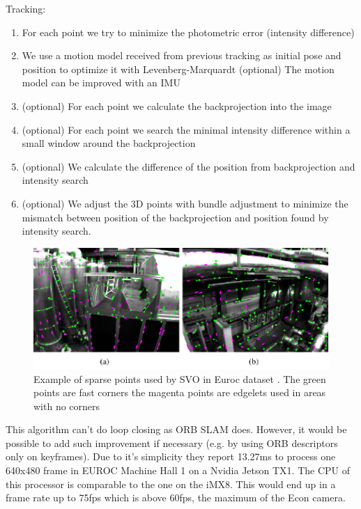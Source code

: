 \documentclass[11pt,a4paper,titlepage,oneside]{report}
\begin{document}
Tracking:
\begin{enumerate}
	\item For each point we try to minimize the photometric error (intensity difference)
	\item We use a motion model received from previous tracking as initial pose and position to optimize it with Levenberg-Marquardt
		\subitem (optional) The motion model can be improved with an IMU
	\item (optional) For each point we calculate the backprojection into the image
	\item (optional) For each point we search the minimal intensity difference within a small window around the backprojection
	\item (optional) We calculate the difference of the position from backprojection and intensity search
	\item (optional) We adjust the 3D points with bundle adjustment to minimize the mismatch between position of the backprojection and position found by intensity search.
\end{enumerate}

\begin{figure}[H]
  \begin{center}
		\includegraphics[width=1.0\textwidth]{img/svo.png}
  \end{center}
	\caption{Example of sparse points used by SVO in Euroc dataset \cite{svo}. The green points are fast corners the magenta points are edgelets used in areas with no corners}\label{fig:svo}
\end{figure}

This algorithm can't do loop closing as ORB SLAM does. However, it would be possible to add such improvement if necessary (e.g. by using ORB descriptors only on keyframes). Due to it's simplicity they report 13.27ms to process one 640x480 frame in EUROC Machine Hall 1 on a Nvidia Jetson TX1. The CPU of this processor is comparable to the one on the iMX8. This would end up in a frame rate up to 75fps which is above 60fps, the maximum of the Econ camera.
\end{document}
